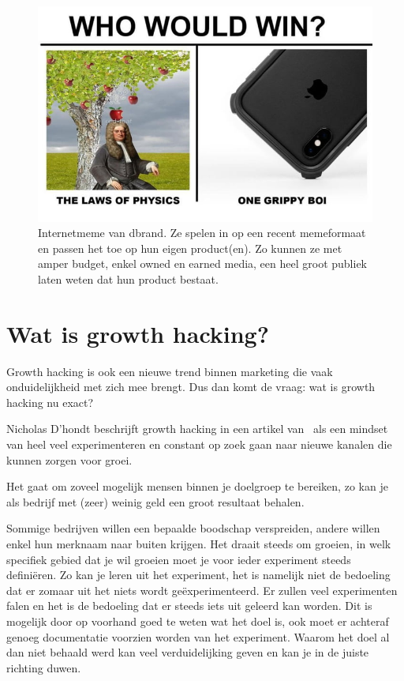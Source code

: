 \begin{figure}[h!]
	\includegraphics[width=\linewidth]{img/dbrand-internetmeme.jpg}
	\centering
	\caption{Internetmeme van dbrand. Ze spelen in op een recent memeformaat en passen het toe op hun eigen product(en). Zo kunnen ze met amper budget, enkel owned en earned media, een heel groot publiek laten weten dat hun product bestaat.}
	\label{fig:defGrowthHacker}
\end{figure}

\section{Wat is growth hacking?}
\label{sec:wat-is-growth-hacking}
Growth hacking is ook een nieuwe trend binnen marketing die vaak onduidelijkheid met zich mee brengt. Dus dan komt de vraag: wat is growth hacking nu exact?

Nicholas D’hondt beschrijft growth hacking in een artikel van~\textcite{Birdhouse2019} als een mindset van heel veel experimenteren en constant op zoek gaan naar nieuwe kanalen die kunnen zorgen voor groei. 

Het gaat om zoveel mogelijk mensen binnen je doelgroep te bereiken, zo kan je als bedrijf met (zeer) weinig geld een groot resultaat behalen. 

Sommige bedrijven willen een bepaalde boodschap verspreiden, andere willen enkel hun merknaam naar buiten krijgen. Het draait steeds om groeien, in welk specifiek gebied dat je wil groeien moet je voor ieder experiment steeds definiëren. Zo kan je leren uit het experiment, het is namelijk niet de bedoeling dat er zomaar uit het niets wordt geëxperimenteerd. Er zullen veel experimenten falen en het is de bedoeling dat er steeds iets uit geleerd kan worden. Dit is mogelijk door op voorhand goed te weten wat het doel is, ook moet er achteraf genoeg documentatie voorzien worden van het experiment. Waarom het doel al dan niet behaald werd kan veel verduidelijking geven en kan je in de juiste richting duwen.

